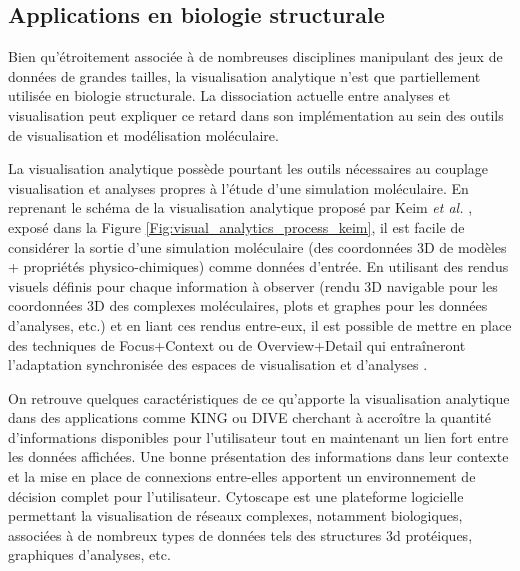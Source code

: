 \subsection{Applications en biologie structurale}
\label{Sec:visuAnalyticsStructBio}

Bien qu'étroitement associée à de nombreuses disciplines manipulant des jeux de données de grandes tailles, la visualisation analytique n'est que partiellement utilisée en biologie structurale. La dissociation actuelle entre analyses et visualisation peut expliquer ce retard dans son implémentation au sein des outils de visualisation et modélisation moléculaire.

La visualisation analytique possède pourtant les outils nécessaires au couplage visualisation et analyses propres à l'étude d'une simulation moléculaire. En reprenant le schéma de la visualisation analytique proposé par Keim \textit{et al.} \cite{keim2010mastering}, exposé dans la Figure \ref{Fig:visual_analytics_process_keim}, il est facile de considérer la sortie d'une simulation moléculaire (des coordonnées 3D de modèles + propriétés physico-chimiques) comme données d'entrée. En utilisant des rendus visuels définis pour chaque information à observer (rendu 3D navigable pour les coordonnées 3D des complexes moléculaires, plots et graphes pour les données d'analyses, etc.) et en liant ces rendus entre-eux, il est possible de mettre en place des techniques de Focus+Context ou de Overview+Detail qui entraîneront l'adaptation synchronisée des espaces de visualisation et d'analyses \cite{schulz2011visual,kerren_toward_2012}.

On retrouve quelques caractéristiques de ce qu'apporte la visualisation analytique dans des applications comme KING \cite{chen_king_2009} ou DIVE \cite{rysavy_dive:_2014} cherchant à accroître la quantité d'informations disponibles pour l'utilisateur tout en maintenant un lien fort entre les données affichées. Une bonne présentation des informations dans leur contexte et la mise en place de connexions entre-elles apportent un environnement de décision complet pour l'utilisateur. Cytoscape \cite{shannon_cytoscape:_2003,doncheva_topological_2012} est une plateforme logicielle permettant la visualisation de réseaux complexes, notamment biologiques, associées à de nombreux types de données tels des structures 3d protéiques, graphiques d'analyses, etc.


